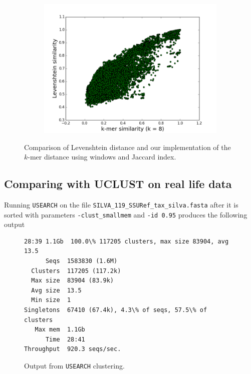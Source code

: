 \begin{figure}[H]
  \centering
  \begin{subfigure}[b]{0.5\textwidth}
    \includegraphics[scale=0.34]{graphics/k8.png}
  \end{subfigure}
  \caption{Comparison of Levenshtein distance and our implementation of the
  $k$-mer distance using windows and Jaccard index.}
  \label{fig:Levenshtein_vs_Kmer}
\end{figure}


\subsection{Comparing with UCLUST on real life data}
Running \texttt{USEARCH} on the file
\texttt{SILVA\_119\_SSURef\_tax\_silva.fasta} after it is sorted with
parameters \texttt{-clust\_smallmem} and \texttt{-id 0.95} produces the
following output

\begin{figure}[H]
\begin{lstlisting}[style=output-style]
28:39 1.1Gb  100.0\% 117205 clusters, max size 83904, avg 13.5
      Seqs  1583830 (1.6M)
  Clusters  117205 (117.2k)
  Max size  83904 (83.9k)
  Avg size  13.5
  Min size  1
Singletons  67410 (67.4k), 4.3\% of seqs, 57.5\% of clusters
   Max mem  1.1Gb
      Time  28:41
Throughput  920.3 seqs/sec.
\end{lstlisting}
  \caption{Output from \texttt{USEARCH} clustering.}
  \label{fig:uclust_silva}
\end{figure}

